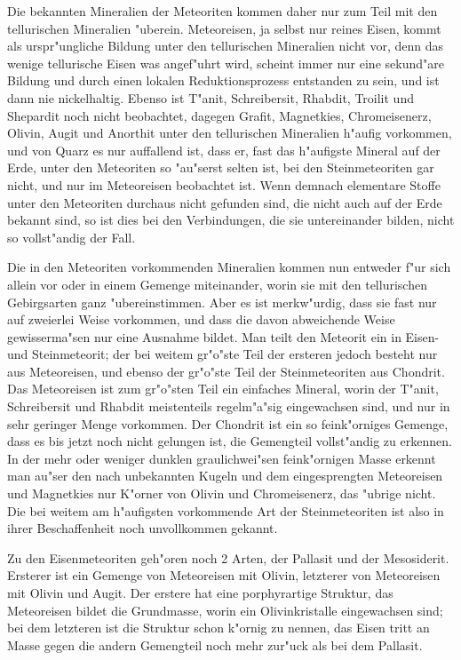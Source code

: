 \documentclass[a4paper, 11pt, oneside, german]{article}
\begin{document}
Die bekannten Mineralien der Meteoriten kommen daher nur zum Teil mit den tellurischen Mineralien "uberein. Meteoreisen, ja selbst nur reines Eisen, kommt als urspr"ungliche Bildung unter den tellurischen Mineralien nicht vor, denn das wenige tellurische Eisen was angef"uhrt wird, scheint immer nur eine sekund"are Bildung und durch einen lokalen Reduktionsprozess entstanden zu sein, und ist dann nie nickelhaltig. Ebenso ist T"anit, Schreibersit, Rhabdit, Troilit und Shepardit noch nicht beobachtet, dagegen Grafit, Magnetkies, Chromeisenerz, Olivin, Augit und Anorthit unter den tellurischen Mineralien h"aufig vorkommen, und von Quarz es nur auffallend ist, dass er, fast das h"aufigste Mineral auf der Erde, unter den Meteoriten so "au"serst selten ist, bei den Steinmeteoriten gar nicht, und nur im Meteoreisen beobachtet ist. Wenn demnach elementare Stoffe unter den Meteoriten durchaus nicht gefunden sind, die nicht auch auf der Erde bekannt sind, so ist dies bei den Verbindungen, die sie untereinander bilden, nicht so vollst"andig der Fall.

Die in den Meteoriten vorkommenden Mineralien kommen nun entweder f"ur sich allein vor oder in einem Gemenge miteinander, worin sie mit den tellurischen Gebirgsarten ganz "ubereinstimmen. Aber es ist merkw"urdig, dass sie fast nur auf zweierlei Weise vorkommen, und dass die davon abweichende Weise gewisserma"sen nur eine Ausnahme bildet. Man teilt den Meteorit ein in Eisen- und Steinmeteorit; der bei weitem gr"o"ste Teil der ersteren jedoch besteht nur aus Meteoreisen, und ebenso der gr"o"ste Teil der Steinmeteoriten aus Chondrit. Das Meteoreisen ist zum gr"o"sten Teil ein einfaches Mineral, worin der T"anit, Schreibersit und Rhabdit meistenteils regelm"a"sig eingewachsen sind, und nur in sehr geringer Menge vorkommen. Der Chondrit ist ein so feink"orniges Gemenge, dass es bis jetzt noch nicht gelungen ist, die Gemengteil vollst"andig zu erkennen. In der mehr oder weniger dunklen graulichwei"sen feink"ornigen Masse erkennt man au"ser den nach unbekannten Kugeln und dem eingesprengten Meteoreisen und Magnetkies nur K"orner von Olivin und Chromeisenerz, das "ubrige nicht. Die bei weitem am h"aufigsten vorkommende Art der Steinmeteoriten ist also in ihrer Beschaffenheit noch unvollkommen gekannt.

Zu den Eisenmeteoriten geh"oren noch 2 Arten, der Pallasit und der Mesosiderit. Ersterer ist ein Gemenge von Meteoreisen mit Olivin, letzterer von Meteoreisen mit Olivin und Augit. Der erstere hat eine porphyrartige Struktur, das Meteoreisen bildet die Grundmasse, worin ein Olivinkristalle eingewachsen sind; bei dem letzteren ist die Struktur schon k"ornig zu nennen, das Eisen tritt an Masse gegen die andern Gemengteil noch mehr zur"uck als bei dem Pallasit.
\end{document}
